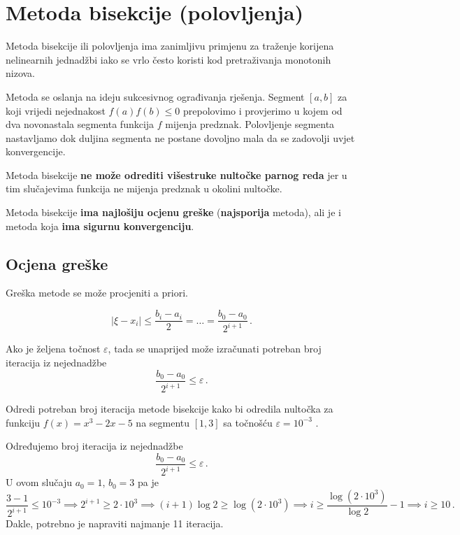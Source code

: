 \section{Metoda bisekcije (polovljenja)}

Metoda bisekcije ili polovljenja ima zanimljivu primjenu za traženje korijena
nelinearnih jednadžbi iako se vrlo često koristi kod pretraživanja monotonih
nizova.

Metoda se oslanja na ideju sukcesivnog ograđivanja rješenja. Segment $[a, b]$ za
koji vrijedi nejednakost $f(a)f(b) \leq 0$ prepolovimo i provjerimo u kojem od
dva novonastala segmenta funkcija $f$ mijenja predznak. Polovljenje segmenta
nastavljamo dok duljina segmenta ne postane dovoljno mala da se zadovolji uvjet
konvergencije.

Metoda bisekcije \textbf{ne može odrediti višestruke nultočke parnog reda} jer u
tim slučajevima funkcija ne mijenja predznak u okolini nultočke.

Metoda bisekcije \textbf{ima najlošiju ocjenu greške} (\textbf{najsporija}
metoda), ali je i metoda koja \textbf{ima sigurnu konvergenciju}.


\subsection{Ocjena greške}

Greška metode se može procjeniti a priori.

$$
    |\xi - x_i| \leq \frac{b_i-a_i}{2} = \dots = \frac{b_0 - a_0}{2^{i+1}}\,.
$$

Ako je željena točnost $\varepsilon$, tada se unaprijed može izračunati potreban
broj iteracija iz nejednadžbe
$$
    \frac{b_0 - a_0}{2^{i+1}} \leq \varepsilon\,.
$$

\begin{example}
    Odredi potreban broj iteracija metode bisekcije kako bi odredila nultočka za
    funkciju $f(x) = x^3 - 2x - 5$ na segmentu $[1,3]$ sa točnošću $\varepsilon
    = 10^{-3}$ .
\end{example}

Određujemo broj iteracija iz nejednadžbe
$$
    \frac{b_0 - a_0}{2^{i+1}} \leq \varepsilon\,.
$$
U ovom slučaju $a_0 = 1$, $b_0 = 3$ pa je
$$
    \frac{3 - 1}{2^{i+1}} \leq 10^{-3} \implies 2^{i+1} \geq 2 \cdot 10^3 \implies
    (i + 1) \log 2 \geq \log (2 \cdot 10^3) \implies i \geq \frac{\log (2 \cdot 10^3)}{\log 2} - 1 \implies i \geq 10\,.
$$
Dakle, potrebno je napraviti najmanje 11 iteracija.

